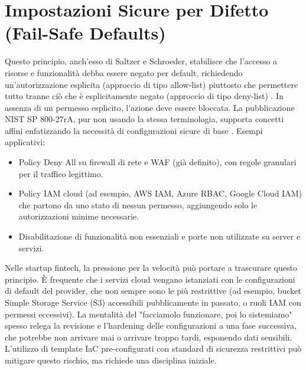 \section{Impostazioni Sicure per Difetto (Fail-Safe Defaults)}
Questo principio, anch'esso di Saltzer e Schroeder, stabilisce che l'accesso a risorse e funzionalità debba essere negato per default, richiedendo un'autorizzazione esplicita (approccio di tipo allow-list) piuttosto che permettere tutto tranne ciò che è esplicitamente negato (approccio di tipo deny-list) \cite{Saltzer_Schroeder_1975}. In assenza di un permesso esplicito, l'azione deve essere bloccata. La pubblicazione NIST SP 800-27rA, pur non usando la stessa terminologia, supporta concetti affini enfatizzando la necessità di configurazioni sicure di base \cite{NIST_SP_800_27rA}.
Esempi applicativi:
\begin{itemize}
\item Policy Deny All su firewall di rete e WAF (già definito), con regole granulari per il traffico legittimo.
\item Policy IAM cloud (ad esempio, AWS IAM, Azure RBAC, Google Cloud IAM) che partono da uno stato di nessun permesso, aggiungendo solo le autorizzazioni minime necessarie.
\item Disabilitazione di funzionalità non essenziali e porte non utilizzate su server e servizi.
\end{itemize}
Nelle startup fintech, la pressione per la velocità può portare a trascurare questo principio. È frequente che i servizi cloud vengano istanziati con le configurazioni di default del provider, che non sempre sono le più restrittive (ad esempio, bucket Simple Storage Service (S3) accessibili pubblicamente in passato, o ruoli IAM con permessi eccessivi). La mentalità del "facciamolo funzionare, poi lo sistemiamo" spesso relega la revisione e l'hardening delle configurazioni a una fase successiva, che potrebbe non arrivare mai o arrivare troppo tardi, esponendo dati sensibili. L'utilizzo di template IaC pre-configurati con standard di sicurezza restrittivi può mitigare questo rischio, ma richiede una disciplina iniziale.
